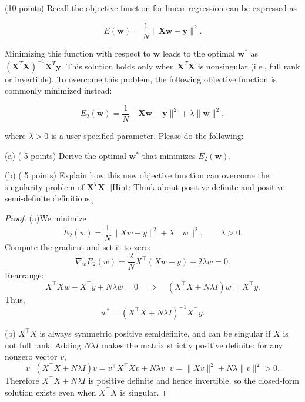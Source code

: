 \documentclass[en,hazy,blue,12pt,normal]{elegantnote}
\begin{document}
\begin{homework}
    (10 points) Recall the objective function for linear regression can be expressed as

$$
E(\mathbf{w})=\frac{1}{N}\|\mathbf{X w}-\mathbf{y}\|^2 .
$$


Minimizing this function with respect to $\mathbf{w}$ leads to the optimal $\mathbf{w}^*$ as $\left(\mathbf{X}^T \mathbf{X}\right)^{-1} \mathbf{X}^T \mathbf{y}$. This solution holds only when $\mathbf{X}^T \mathbf{X}$ is nonsingular (i.e., full rank or invertible). To overcome this problem, the following objective function is commonly minimized instead:

$$
E_2(\mathbf{w})=\frac{1}{N}\|\mathbf{X w}-\mathbf{y}\|^2+\lambda\|\mathbf{w}\|^2,
$$

where $\lambda>0$ is a user-specified parameter. Please do the following:

(a) ( 5 points) Derive the optimal $\mathbf{w}^*$ that minimizes $E_2(\mathbf{w})$.

(b) ( 5 points) Explain how this new objective function can overcome the singularity problem of $\mathbf{X}^T \mathbf{X}$. [Hint: Think about positive definite and positive semi-definite definitions.]
\end{homework}

\begin{proof}
    (a)We minimize
\[
E_2(w)=\frac{1}{N}\lVert Xw-y\rVert^2 + \lambda \lVert w\rVert^2,\qquad \lambda>0.
\]
Compute the gradient and set it to zero:
\[
\nabla_w E_2(w) = \frac{2}{N}X^\top(Xw-y) + 2\lambda w = 0.
\]
Rearrange:
\[
X^\top X w - X^\top y + N\lambda w = 0
\quad\Rightarrow\quad
(X^\top X + N\lambda I)w = X^\top y.
\]
Thus,
\[
w^\ast = (X^\top X + N\lambda I)^{-1}X^\top y.
\]

(b)
$X^\top X$ is always symmetric positive semidefinite, and can be singular if $X$ is not full rank. Adding $N\lambda I$ makes the matrix strictly positive definite: for any nonzero vector $v$,
\[
v^\top (X^\top X + N\lambda I)v = v^\top X^\top X v + N\lambda v^\top v = \lVert Xv\rVert^2 + N\lambda \lVert v\rVert^2 > 0.
\]
Therefore $X^\top X + N\lambda I$ is positive definite and hence invertible, so the closed-form solution exists even when $X^\top X$ is singular.
\end{proof}
\end{document}
